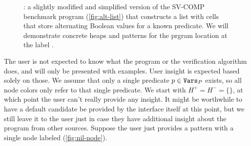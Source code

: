 \begin{figure}
  \centering
  
  \caption{\altlistsimplified: a slightly modified and simplified version of the SV-COMP benchmark program \altlist (\autoref{fig:alt-list}) that constructs a list with cells that store alternating Boolean values for a known predicate. We will demonstrate concrete heaps and patterns for the prgram location at the label \checkpoint.}
  \label{fig:alt-list-simplified}
\end{figure}

The user is not expected to know what the program or the verification algorithm does,
and will only be presented with examples. User insight is expected based solely on
those. We assume that only a single predicate $p \in \mathtt{Vars}_P$ exists, so all node
colors only refer to that single predicate. We start with $H^{+} = H^{-} = \{\}$, at
which point the user can't really provide any insight. It might be worthwhile to have a
default candidate be provided by the interface itself at this point, but we still leave
it to the user just in case they have additional insight about the program from other
sources. Suppose the user just provides a pattern with a single node labeled \nilconst (\autoref{fig:nil-node}).

